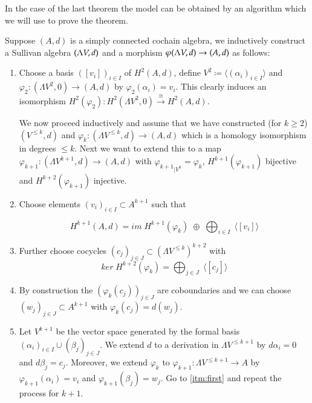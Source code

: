 In the case of the last theorem the model can be obtained by an algorithm which we will use to prove the theorem.

\begin{Algorithm}
\label{alg:ConstructionOfMinimalSullivanAlgebra}
 Suppose $(A,d)$ is a simply connected cochain algebra, we inductively construct a Sullivan algebra $(\Lambda V,d)$ and a morphism
 $\varphi (\Lambda V,d) \to (A,d)$ as follows:
 
 \begin{enumerate}
  \item \label{itm:FirstAlgorithmStep} Choose a basis $([v_i])_{i \in I}$ of $H^2(A,d)$, define $V^2 \coloneqq \langle (\alpha_i)_{i \in I} \rangle$ and
  $\varphi_2 \colon (\Lambda V^2,0) \to (A,d)$ by $\varphi_2(\alpha_i) = v_i$. This clearly induces an isomorphism 
  $H^2(\varphi_2) \colon H^2(\Lambda V^2, 0) \overset{\cong}{\to} H^2(A,d)$.
   
   We now proceed inductively and assume that we have constructed (for $k \geq 2$) $(V^{\leq k}, d)$ and
   ${\varphi_k \colon (\Lambda V^{\leq k}, d) \to (A,d)}$ which is a homology isomorphism in degrees $\leq k$.
   Next we want to extend this to a map $\varphi_{k+1} \colon (\Lambda V^{k+1}, d) \to (A,d)$ with 
   ${\varphi_{k+1}}_{|V^k} = \varphi_k$, $H^{k+1}(\varphi_{k+1})$ bijective and $H^{k + 2}(\varphi_{k+1})$ injective.
   
   \item \label{itm:first} Choose elements $(v_i)_{i \in I} \subset A^{k+1}$ such that
   
   $$H^{k+1}(A,d) = im \; H^{k+1}(\varphi_k) \; \oplus \; \bigoplus_{i \in I} \; \langle [v_i] \rangle $$
   
   \item Further choose cocycles $(c_j)_{j \in J} \subset (\Lambda V^{\leq k})^{k+2}$ with
   $$ ker \; H^{k+2}(\varphi_k) = \bigoplus_{j \in J} \; \langle [c_j] \rangle$$
   
   \item By construction the $(\varphi_k(c_j))_{j \in J}$ are coboundaries and we can choose 
   $(w_j)_{j \in J} \subset A^{k+1}$ with $\varphi_k (c_j) = d(w_j)$.
   \item \label{itm:second} Let 
   $V^{k+1}$ be the vector space generated by the formal basis $(\alpha_i)_{i \in I} \cup (\beta_j)_{j \in J}$. We extend $d$
   to a derivation in $\Lambda V^{\leq k+1}$ by $d \alpha_i = 0$ and $d \beta_j = c_j$. Moreover, we extend $\varphi_k$
   to $\varphi_{k+1} \colon \Lambda V^{ \leq k+1} \to A$ by $\varphi_{k+1} (\alpha_i) = v_i$ and 
   $\varphi_{k+1} (\beta_j) = w_j$. Go to \ref{itm:first} and repeat the process for $k+1$.
 \end{enumerate}

\end{Algorithm}
